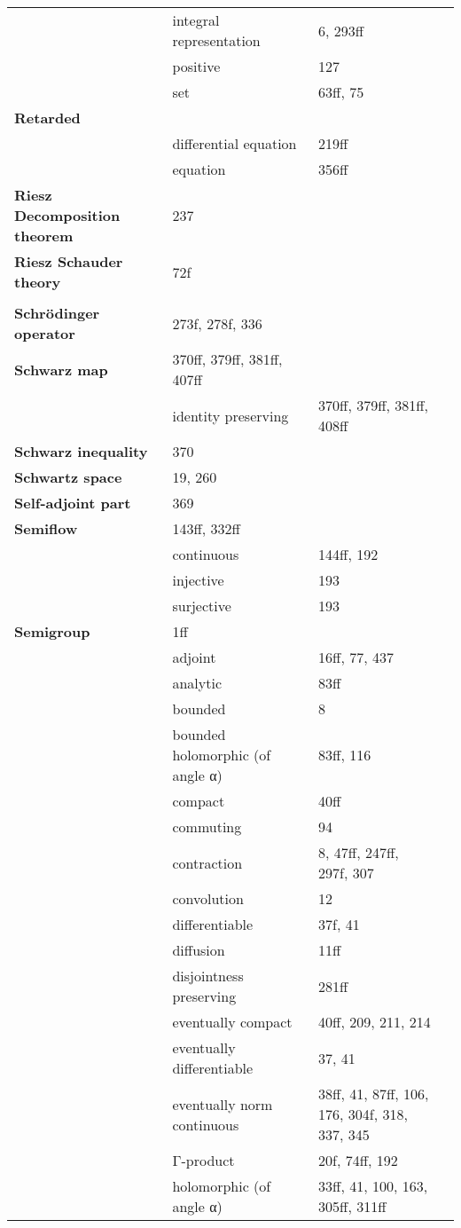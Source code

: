 \documentclass[10pt]{scrartcl}
\begin{document}
\begin{longtable}{>{\bfseries}p{4cm}p{4cm}p{4cm}p{4cm}}
	& integral representation 	& 6, 293ff \\
	& positive 	& 127 \\
	& set 	& 63ff, 75 \\
Retarded 	& \\
	& differential equation 	& 219ff \\
	& equation 	& 356ff \\
Riesz Decomposition theorem 	& 237 \\
Riesz Schauder theory 	& 72f \\
	& \\
Schrödinger operator 	& 273f, 278f, 336 \\
Schwarz map 	& 370ff, 379ff, 381ff, 407ff \\
	& identity preserving 	& 370ff, 379ff, 381ff, 408ff \\
Schwarz inequality 	& 370 \\
Schwartz space 	& 19, 260 \\
Self-adjoint part 	& 369 \\
Semiflow 	& 143ff, 332ff \\
	& continuous 	& 144ff, 192 \\
	& injective 	& 193 \\
	& surjective 	& 193 \\
Semigroup 	& 1ff \\
	& adjoint 	& 16ff, 77, 437 \\
	& analytic 	& 83ff \\
	& bounded 	& 8 \\
	& bounded holomorphic (of angle α) 	& 83ff, 116 \\
	& compact 	& 40ff \\
	& commuting 	& 94 \\
	& contraction 	& 8, 47ff, 247ff, 297f, 307 \\
	& convolution 	& 12 \\
	& differentiable 	& 37f, 41 \\
	& diffusion 	& 11ff \\
	& disjointness preserving 	& 281ff \\
	& eventually compact 	& 40ff, 209, 211, 214 \\
	& eventually differentiable 	& 37, 41 \\
	& eventually norm continuous 	& 38ff, 41, 87ff, 106, 176, 304f, 318, 337, 345 \\
	& Γ-product 	& 20f, 74ff, 192 \\
	& holomorphic (of angle α) 	& 33ff, 41, 100, 163, 305ff, 311ff \\

\end{longtable}
\end{document}

